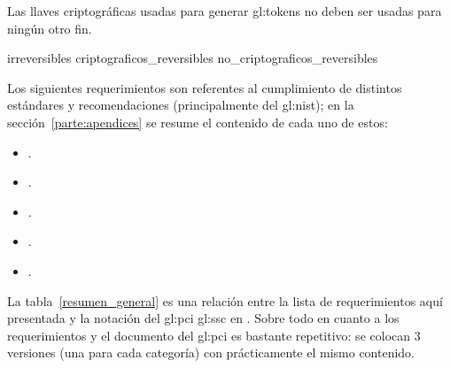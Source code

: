 {
  Las llaves criptográficas usadas para generar \glspl{gl:token} no
  deben ser usadas para ningún otro fin.
}

{irreversibles}
{criptograficos_reversibles}
{no_criptograficos_reversibles}


Los siguientes requerimientos son referentes al cumplimiento
de distintos estándares y recomendaciones (principalmente del \gls{gl:nist});
en la sección~\ref{parte:apendices} se resume el contenido de cada uno de
estos:

\begin{itemize}
  \item {}.
  \item {}.
  \item {}.
  \item {}.
  \item {}.
\end{itemize}

La tabla~\ref{resumen_general} es una relación entre la lista de
requerimientos aquí presentada y la notación del \gls{gl:pci} \gls{gl:ssc} en
\cite{pci_tokens}. Sobre todo en cuanto a los requerimientos
 y
 el documento del \gls{gl:pci} es
bastante repetitivo: se colocan 3 versiones (una para cada categoría) con
prácticamente el mismo contenido.

\newcommand{\columnaUno}{4.0in}
\newcommand{\columnaDos}{2.0in}

